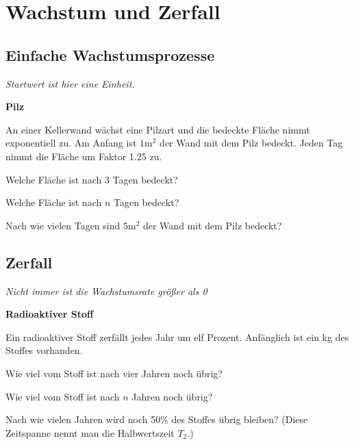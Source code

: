 
\renewcommand{\bbwAufgabenBlockID}{FctWZ}%

\renewcommand{\metaHeaderLine}{Exponentialfunktionen}
\renewcommand{\arbeitsblattTitel}{Aufgaben zu Wachstum und Zerfall}



\arbeitsblattHeader{}

\section{Wachstum und Zerfall}

\subsection{Einfache Wachstumsprozesse}
\textit{Startwert ist hier eine Einheit.}


\bbwActAufgabenNr{} \textbf{Pilz}

An einer Kellerwand wächst eine Pilzart und die bedeckte Fläche nimmt exponentiell zu.
Am Anfang ist $1 \textrm{m}^2$ der Wand mit dem Pilz bedeckt. Jeden Tag nimmt die Fläche um Faktor 1.25 zu.

\begin{bbwAufgabenBlock}
\item Welche Fläche ist nach 3 Tagen bedeckt?
\item Welche Fläche ist nach $n$ Tagen bedeckt?
\item Nach wie vielen Tagen sind $5 \textrm{m}^2$ der Wand mit dem Pilz bedeckt?
\end{bbwAufgabenBlock}
\platzFuerBerechnungenBisEndeSeite{}


\subsection{Zerfall}
\textit{Nicht immer ist die Wachstumsrate größer als 0}

\bbwActAufgabenNr{} \textbf{Radioaktiver Stoff}

Ein radioaktiver Stoff zerfällt jedes Jahr um elf Prozent. Anfänglich ist ein kg des Stoffes vorhanden.

\begin{bbwAufgabenBlock}
\item Wie viel vom Stoff ist nach vier Jahren noch übrig?
\item Wie viel vom Stoff ist nach $n$ Jahren noch übrig?
\item Nach wie vielen Jahren wird noch 50\% des Stoffes übrig bleiben? (Diese Zeitspanne nennt man die Halbwertszeit $T_2$.)
\end{bbwAufgabenBlock}
\platzFuerBerechnungenBisEndeSeite{}



